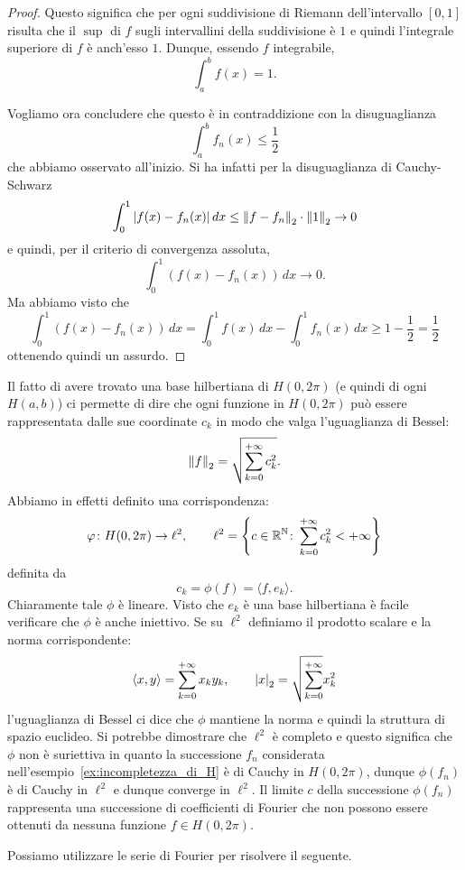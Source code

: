 \begin{proof}
Questo significa che per ogni suddivisione di Riemann dell'intervallo $[0,1]$
risulta che il $\sup$ di $f$ sugli intervallini della suddivisione è $1$ e quindi
l'integrale superiore di $f$ è anch'esso $1$. 
Dunque, essendo $f$ integrabile,
\[
  \int_a^b f(x) = 1.
\]

Vogliamo ora concludere che questo è in contraddizione con la disuguaglianza
\[
  \int_a^b f_n(x) \le \frac 1 2
\]
che abbiamo osservato all'inizio.
Si ha infatti per la disuguaglianza di Cauchy-Schwarz
\begin{align*}
  \int_0^1 {\left|f(x)-f_n(x)\right|}\, dx
  \le {\left\Vert f-f_n\right\Vert}_2\cdot {\left\Vert 1\right\Vert}_2  \to 0
\end{align*}
e quindi, per il criterio di convergenza assoluta,
\[
  \int_0^1 (f(x) - f_n(x))\, dx \to 0.
\]
Ma abbiamo visto che
\[
  \int_0^1 (f(x) - f_n(x))\, dx
  = \int_0^1 f(x)\, dx - \int_0^1 f_n(x)\, dx
  \ge 1 - \frac 1 2 = \frac 1 2
\]
ottenendo quindi un assurdo.
\end{proof}

Il fatto di avere trovato una base hilbertiana di $H(0,2\pi)$ (e quindi
di ogni $H(a,b)$) ci permette di
dire che ogni funzione in $H(0,2\pi)$ può essere rappresentata dalle sue
coordinate $c_k$ in modo che valga l'uguaglianza di Bessel:
\[
  {\left\Vert f\right\Vert}_2 = \sqrt{\sum_{k=0}^{+\infty} c_k^2}.
\]
Abbiamo in effetti definito una corrispondenza:
\[
  \varphi \colon H(0,2\pi) \to \ell^2,
  \qquad
  \ell^2={\left\{ c\in {\mathbb R}^{\mathbb N} \colon \sum_{k=0}^{+\infty} c_k^2<+\infty \right\}}
\]
definita da
\[
  c_k = \phi(f) = \langle f, e_k\rangle.
\]
Chiaramente tale $\phi$ è lineare. Visto che $e_k$ è una base hilbertiana
è facile verificare che $\phi$ è anche iniettivo. Se su $\ell^2$
definiamo il prodotto scalare e la norma corrispondente:
\[
  \langle x,y\rangle = \sum_{k=0}^{+\infty} x_k y_k, \qquad
  {\left|x\right|}_2 = \sqrt{\sum_{k=0}^{+\infty}} x_k^2
\]
l'uguaglianza di Bessel ci dice che $\phi$ mantiene la norma e quindi
la struttura di spazio euclideo. Si potrebbe dimostrare che $\ell^2$
è completo e questo significa che $\phi$ non è suriettiva in quanto
la successione $f_n$
considerata nell'esempio~\ref{ex:incompletezza_di_H}
è di Cauchy in $H(0,2\pi)$, dunque $\phi(f_n)$ è di Cauchy in $\ell^2$
e dunque converge in $\ell^2$. Il limite $c$ della successione $\phi(f_n)$
rappresenta una successione di coefficienti di Fourier che non possono
essere ottenuti da nessuna funzione $f\in H(0,2\pi)$.

Possiamo utilizzare le serie di Fourier per risolvere 
il seguente.

